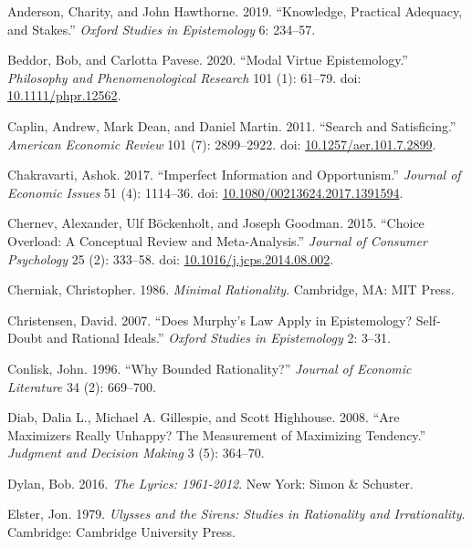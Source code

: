 \documentclass[
  11pt,
  letterpaper,
  DIV=11,
  numbers=noendperiod,
  twoside]{scrartcl}
\newlength{\cslhangindent}
\newenvironment{CSLReferences}[2] %
 {\begin{list}{}{%
  \setlength{\itemindent}{0pt}
  \setlength{\leftmargin}{0pt}
  \setlength{\parsep}{0pt}
  \ifodd #1
   \setlength{\leftmargin}{\cslhangindent}
   \setlength{\itemindent}{-1\cslhangindent}
  \fi
  \setlength{\itemsep}{#2\baselineskip}}}
 {\end{list}}
\begin{document}
\label{refs}
\begin{CSLReferences}{1}{0}
Anderson, Charity, and John Hawthorne. 2019. {``Knowledge, Practical
Adequacy, and Stakes.''} \emph{Oxford Studies in Epistemology} 6:
234--57.

Beddor, Bob, and Carlotta Pavese. 2020. {``Modal Virtue Epistemology.''}
\emph{Philosophy and Phenomenological Research} 101 (1): 61--79. doi:
\href{https://doi.org/10.1111/phpr.12562}{10.1111/phpr.12562}.

Caplin, Andrew, Mark Dean, and Daniel Martin. 2011. {``Search and
Satisficing.''} \emph{American Economic Review} 101 (7): 2899--2922.
doi:
\href{https://doi.org/10.1257/aer.101.7.2899}{10.1257/aer.101.7.2899}.

Chakravarti, Ashok. 2017. {``Imperfect Information and Opportunism.''}
\emph{Journal of Economic Issues} 51 (4): 1114--36. doi:
\href{https://doi.org/10.1080/00213624.2017.1391594}{10.1080/00213624.2017.1391594}.

Chernev, Alexander, Ulf Böckenholt, and Joseph Goodman. 2015. {``Choice
Overload: A Conceptual Review and Meta-Analysis.''} \emph{Journal of
Consumer Psychology} 25 (2): 333--58. doi:
\href{https://doi.org/10.1016/j.jcps.2014.08.002}{10.1016/j.jcps.2014.08.002}.

Cherniak, Christopher. 1986. \emph{Minimal Rationality}. Cambridge, MA:
MIT Press.

Christensen, David. 2007. {``Does Murphy's Law Apply in Epistemology?
Self-Doubt and Rational Ideals.''} \emph{Oxford Studies in Epistemology}
2: 3--31.

Conlisk, John. 1996. {``Why Bounded Rationality?''} \emph{Journal of
Economic Literature} 34 (2): 669--700.

Diab, Dalia L., Michael A. Gillespie, and Scott Highhouse. 2008. {``Are
Maximizers Really Unhappy? The Measurement of Maximizing Tendency.''}
\emph{Judgment and Decision Making} 3 (5): 364--70.

Dylan, Bob. 2016. \emph{The Lyrics: 1961-2012}. New York: Simon \&
Schuster.

Elster, Jon. 1979. \emph{Ulysses and the Sirens: Studies in Rationality
and Irrationality}. Cambridge: Cambridge University Press.


\end{CSLReferences}
\end{document}
